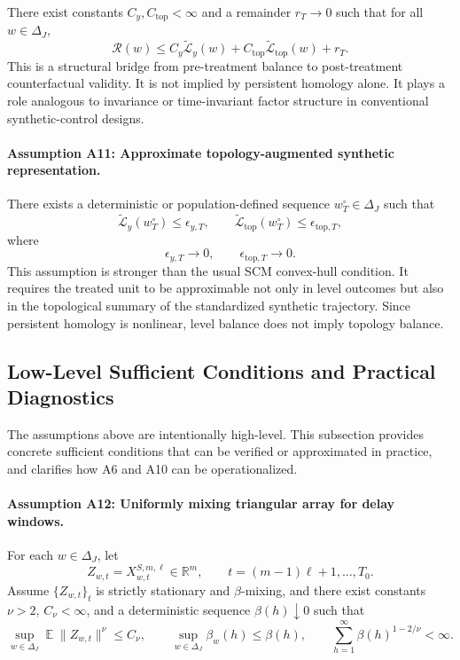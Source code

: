 \documentclass[11pt]{article}
\theoremstyle{plain}
\theoremstyle{definition}
\theoremstyle{remark}
\DeclareMathOperator{\E}{\mathbb{E}}
\newcommand{\R}{\mathbb{R}}
\newcommand{\1}{\mathbbm{1}}
\begin{document}
There exist constants \(C_y,C_{\mathrm{top}}<\infty\) and a remainder
\(r_T\to0\) such that for all \(w\in\Delta_J\),
\[
\mathcal R(w)
\le
C_y\widetilde{\mathcal L}_y(w)
+
C_{\mathrm{top}}\widetilde{\mathcal L}_{\mathrm{top}}(w)
+
r_T.
\]
This is a structural bridge from pre-treatment balance to post-treatment
counterfactual validity. It is not implied by persistent homology alone. It
plays a role analogous to invariance or time-invariant factor structure in
conventional synthetic-control designs.

\paragraph{Assumption A11: Approximate topology-augmented synthetic representation.}
There exists a deterministic or population-defined sequence
\(w_T^\circ\in\Delta_J\) such that
\[
\widetilde{\mathcal L}_y(w_T^\circ)
\le
\epsilon_{y,T},
\qquad
\widetilde{\mathcal L}_{\mathrm{top}}(w_T^\circ)
\le
\epsilon_{\mathrm{top},T},
\]
where
\[
\epsilon_{y,T}\to0,
\qquad
\epsilon_{\mathrm{top},T}\to0.
\]
This assumption is stronger than the usual SCM convex-hull condition. It
requires the treated unit to be approximable not only in level outcomes but
also in the topological summary of the standardized synthetic trajectory. Since
persistent homology is nonlinear, level balance does not imply topology
balance.

\subsection{Low-Level Sufficient Conditions and Practical Diagnostics}

The assumptions above are intentionally high-level. This subsection provides
concrete sufficient conditions that can be verified or approximated in
practice, and clarifies how A6 and A10 can be operationalized.

\paragraph{Assumption A12: Uniformly mixing triangular array for delay windows.}
For each \(w\in\Delta_J\), let
\[
Z_{w,t}
=
X_{w,t}^{S,m,\ell}
\in\R^m,
\qquad
t=(m-1)\ell+1,\ldots,T_0.
\]
Assume \(\{Z_{w,t}\}_{t}\) is strictly stationary and \(\beta\)-mixing, and
there exist constants \(\nu>2\), \(C_\nu<\infty\), and a deterministic sequence
\(\beta(h)\downarrow0\) such that
\[
\sup_{w\in\Delta_J}\E\|Z_{w,t}\|^\nu\le C_\nu,
\qquad
\sup_{w\in\Delta_J}\beta_w(h)\le \beta(h),
\qquad
\sum_{h=1}^{\infty}\beta(h)^{1-2/\nu}<\infty.
\]
\end{document}
